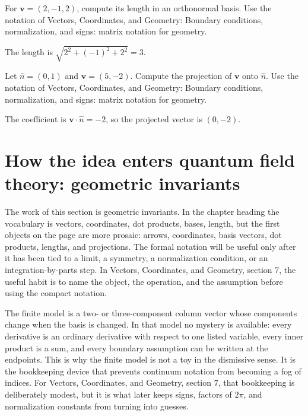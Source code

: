 \begin{exercise}
For \(\bm v=(2,-1,2)\), compute its length in an orthonormal basis.  Use the notation of Vectors, Coordinates, and Geometry: Boundary conditions, normalization, and signs: matrix notation for geometry.
\begin{answer}
The length is \(\sqrt{2^2+(-1)^2+2^2}=3\).
\end{answer}
\end{exercise}

\begin{exercise}
Let \(\hat n=(0,1)\) and \(\bm v=(5,-2)\).  Compute the projection of \(\bm v\) onto \(\hat n\).  Use the notation of Vectors, Coordinates, and Geometry: Boundary conditions, normalization, and signs: matrix notation for geometry.
\begin{answer}
The coefficient is \(\bm v\cdot\hat n=-2\), so the projected vector is \((0,-2)\).
\end{answer}
\end{exercise}



\section{How the idea enters quantum field theory: geometric invariants}

The work of this section is geometric invariants.  In the chapter heading the vocabulary is vectors, coordinates, dot products, bases, length, but the first objects on the page are more prosaic: arrows, coordinates, basis vectors, dot products, lengths, and projections.  The formal notation will be useful only after it has been tied to a limit, a symmetry, a normalization condition, or an integration-by-parts step.  In Vectors, Coordinates, and Geometry, section 7, the useful habit is to name the object, the operation, and the assumption before using the compact notation.

The finite model is a two- or three-component column vector whose components change when the basis is changed.  In that model no mystery is available: every derivative is an ordinary derivative with respect to one listed variable, every inner product is a sum, and every boundary assumption can be written at the endpoints.  This is why the finite model is not a toy in the dismissive sense.  It is the bookkeeping device that prevents continuum notation from becoming a fog of indices.  For Vectors, Coordinates, and Geometry, section 7, that bookkeeping is deliberately modest, but it is what later keeps signs, factors of \(2\pi\), and normalization constants from turning into guesses.


